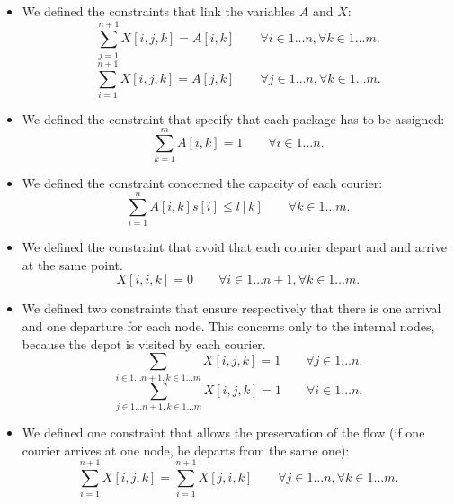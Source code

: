 \begin{itemize}
    \item We defined the constraints that link the variables $A$ and $X$:
    \begin{equation}
        \sum_{j = 1}^{n+1} X[i,j,k] = A[i,k]  \qquad  \forall i \in 1 \dots n,\forall k \in 1 \dots m.
    \end{equation}
    \begin{equation}
        \sum_{i = 1}^{n+1} X[i,j,k] = A[j,k]  \qquad  \forall j \in 1 \dots n,\forall k \in 1 \dots m.
    \end{equation}

    \item We defined the constraint that specify that each package has to be assigned:
    \begin{equation}
        \sum_{k = 1}^{m} A[i,k] = 1  \qquad \forall i \in 1 \dots n.
    \end{equation}

    \item We defined the constraint concerned the capacity of each courier:
    \begin{equation}
        \sum_{i = 1}^{n} A[i,k] s[i] \leq l[k] \qquad \forall k \in 1 \dots m.
    \end{equation}

    \item We defined the constraint that avoid that each courier depart and and arrive at the same point.
    \begin{equation}
        X[i,i,k] = 0 \qquad \forall i \in 1 \dots n+1, \forall k \in 1 \dots m.
    \end{equation}

    \item We defined two constraints that ensure respectively that there is one arrival and one departure for each node. This concerns only to the internal nodes, because the depot is visited by each courier. 
    \begin{equation}
        \sum_{i \in 1 \dots n+1, k \in 1 \dots m} X[i,j,k] = 1 \qquad \forall j \in 1 \dots n.  
    \end{equation}
    \begin{equation}
        \sum_{j \in 1 \dots n+1, k \in 1 \dots m} X[i,j,k] = 1 \qquad \forall i \in 1 \dots n.  
    \end{equation}

    \item We defined one constraint that allows the preservation of the flow (if one courier arrives at one node, he departs from the same one):
    \begin{equation}
        \sum_{i = 1}^{n+1} X[i,j,k] = \sum_{i = 1}^{n+1} X[j,i,k] \qquad \forall j \in 1 \dots n, \forall k \in 1 \dots m.
    \end{equation}


\end{itemize}

